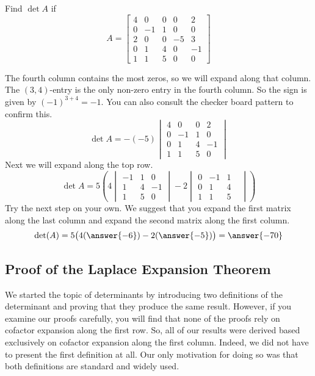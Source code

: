 \documentclass{ximera}
\begin{document}
\begin{example}\label{ex:laplace2}
Find $\det{A}$ if
$$A=\begin{bmatrix}4&0&0&0&2\\0&-1&1&0&0\\2&0&0&-5&3\\0&1&4&0&-1\\1&1&5&0&0\end{bmatrix}$$

\begin{explanation}
The fourth column contains the most zeros, so we will expand along that column.  The  $(3, 4)$-entry is the only non-zero entry in the fourth column.  So the sign is given by $(-1)^{3+4}=-1$.  You can also consult the checker board pattern to confirm this.  
$$\det{A}=-(-5)\begin{vmatrix}4&0&0&2\\0&-1&1&0\\0&1&4&-1\\1&1&5&0\end{vmatrix}
$$
Next we will expand along the top row.
$$\det{A}=5\left(4\begin{vmatrix}-1&1&0\\1&4&-1\\1&5&0\end{vmatrix}-2\begin{vmatrix}0&-1&1\\0&1&4&\\1&1&5\end{vmatrix}\right)$$
Try the next step on your own.  We suggest that you expand the first matrix along the last column and expand the second matrix along the first column.
$$\det(A)=5\big(4(\answer{-6})-2(\answer{-5})\big)=\answer{-70}$$
\end{explanation}
\end{example}

\subsection*{Proof of the Laplace Expansion Theorem}

We started the topic of determinants by introducing two definitions of the determinant and proving that they produce the same result.  However, if you examine our proofs carefully, you will find that none of the proofs rely on cofactor expansion along the first row.  So, all of our results were derived based exclusively on cofactor expansion along the first column.  Indeed, we did not have to present the first definition at all. Our only motivation for doing so was that both definitions are standard and widely used. 
\end{document}
